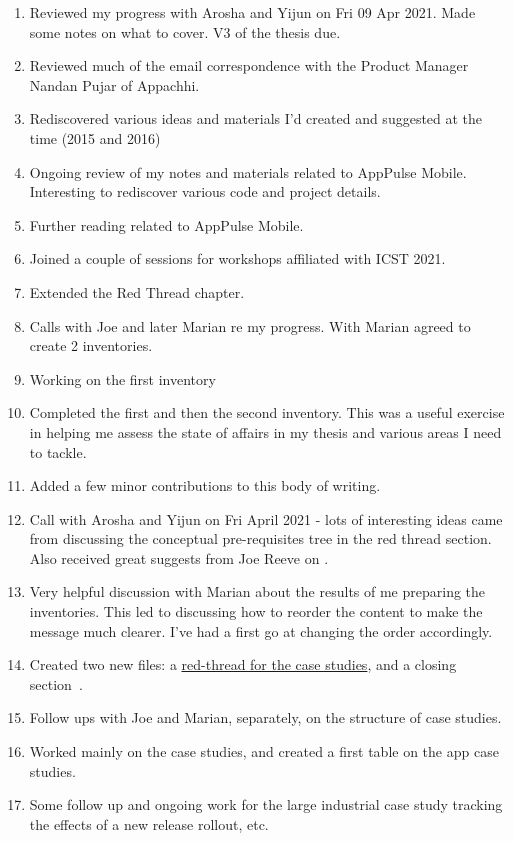\begin{enumerate}
    \item Reviewed my progress with Arosha and Yijun on Fri 09 Apr 2021. Made some notes on what to cover. V3 of the thesis due.
    \item Reviewed much of the email correspondence with the Product Manager Nandan Pujar of Appachhi. 
    \item Rediscovered various ideas and materials I'd created and suggested at the time (2015 and 2016)
    \item Ongoing review of my notes and materials related to AppPulse Mobile. Interesting to rediscover various code and project details.
    \item Further reading related to AppPulse Mobile.
    \item Joined a couple of sessions for workshops affiliated with ICST 2021.
    \item Extended the Red Thread chapter.
    \item Calls with Joe and later Marian re my progress. With Marian agreed to create 2 inventories.
    \item Working on the first inventory
    \item Completed the first and then the second inventory. This was a useful exercise in helping me assess the state of affairs in my thesis and various areas I need to tackle.
    \item Added a few minor contributions to this body of writing.
    \item Call with Arosha and Yijun on Fri  April 2021 - lots of interesting ideas came from discussing the conceptual pre-requisites tree in the red thread section. Also received great suggests from Joe Reeve on .
    \item Very helpful discussion with Marian about the results of me preparing the inventories. This led to discussing how to reorder the content to make the message much clearer. I've had a first go at changing the order accordingly.
    \item Created two new files: a \href{section-case-studies-red-thread}{red-thread for the case studies}, and a closing section~\href{section-synthesis-recommendations}{}.
    \item Follow ups with Joe and Marian, separately, on the structure of case studies. 
    \item Worked mainly on the case studies, and created a first table on the app case studies.
    \item Some follow up and ongoing work for the large industrial case study tracking the effects of a new release rollout, etc.

\end{enumerate}
